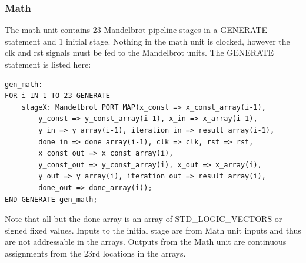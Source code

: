\documentclass[titlepage]{article}      %
\begin{document}
\subsubsection{Math}
The math unit contains 23 Mandelbrot pipeline stages in a GENERATE statement and 1 initial stage. Nothing in the math unit is clocked, however the clk and rst signals must be fed to the Mandelbrot units. The GENERATE statement is listed here:
\begin{lstlisting}
gen_math:
FOR i IN 1 TO 23 GENERATE
	stageX: Mandelbrot PORT MAP(x_const => x_const_array(i-1),
		y_const => y_const_array(i-1), x_in => x_array(i-1),
		y_in => y_array(i-1), iteration_in => result_array(i-1),
		done_in => done_array(i-1), clk => clk, rst => rst,
		x_const_out => x_const_array(i),
		y_const_out => y_const_array(i), x_out => x_array(i),
		y_out => y_array(i), iteration_out => result_array(i),
		done_out => done_array(i));
END GENERATE gen_math;
\end{lstlisting}
Note that all but the done array is an array of STD\_LOGIC\_VECTORS or signed fixed values. Inputs to the initial stage are from Math unit inputs and thus are not addressable in the arrays. Outputs from the Math unit are continuous assignments from the 23rd locations in the arrays.
\end{document}
